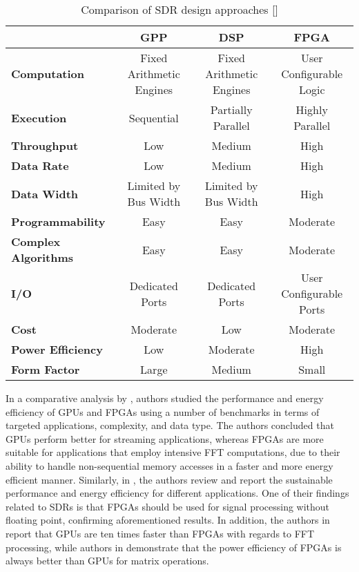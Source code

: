 \begin{table}[ht]
  \caption{Comparison of SDR design approaches [\citeauthor{DBLP:journals/corr/abs-1804-06564}]}
  \label{table:sdr_approach_comparison}
  \centering
  \begin{adjustbox}{width=1\textwidth}
  \begin{tabular}{>{\bfseries}l|c|c|c}
    \toprule
    & \textbf{GPP} & \textbf{DSP} & \textbf{FPGA} \\
    \midrule
    Computation        & Fixed Arithmetic Engines & Fixed Arithmetic Engines & User Configurable Logic\\
    Execution          & Sequential               & Partially Parallel       & Highly Parallel\\
    Throughput         & Low                      & Medium                   & High\\
    Data Rate          & Low                      & Medium                   & High\\
    Data Width         & Limited by Bus Width     & Limited by Bus Width     & High\\
    Programmability    & Easy                     & Easy                     & Moderate\\
    Complex Algorithms & Easy                     & Easy                     & Moderate\\
    I/O                & Dedicated Ports          & Dedicated Ports          & User Configurable Ports\\
    Cost               & Moderate                 & Low                      & Moderate\\
    Power Efficiency   & Low                      & Moderate                 & High\\
    Form Factor        & Large                    & Medium                   & Small\\
    \bottomrule
  \end{tabular}
  \end{adjustbox}
\end{table}

In a comparative analysis by \cite{betkaoui2010a}, authors studied the performance and energy efficiency of GPUs and FPGAs using a number of benchmarks in terms of targeted applications, complexity, and data type. The authors concluded that GPUs perform better for streaming applications, whereas FPGAs are more suitable for applications that employ intensive FFT computations, due to their ability to handle non-sequential memory accesses in a faster and more energy efficient manner. Similarly, in \cite{v2014a}, the authors review and report the sustainable performance and energy efficiency for different applications. One of their findings related to SDRs is that FPGAs should be used for signal processing without floating point, confirming aforementioned results. In addition, the authors in \cite{duan2011a} report that GPUs are ten times faster than FPGAs with regards to FFT processing, while authors in \cite{kestur2010a} demonstrate that the power efficiency of FPGAs is always better than GPUs for matrix operations.
